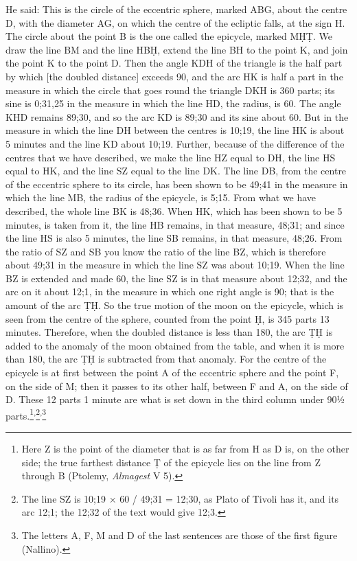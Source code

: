 \documentclass[11pt]{article}
\newcommand{\ArPage}[1]{\marginpar{\footnotesize\color{gray}Ar.\,p.\,#1}}
\begin{document}
\par \ArPage{82}He said: This is the circle of the eccentric sphere, marked ABG, about the centre D, with the diameter AG, on which the centre of the ecliptic falls, at the sign H. The circle about the point B is the one called the epicycle, marked MḤṬ. We draw the line BM and the line HBḤ, extend the line BH to the point K, and join the point K to the point D. Then the angle KDH of the triangle is the half part by which [the doubled distance] exceeds 90, and the arc HK is half a part in the measure in which the circle that goes round the triangle DKH is 360 parts; its sine is 0;31,25 in the measure in which the line HD, the radius, is 60. The angle KHD remains 89;30, and so the arc KD is 89;30 and its sine about 60. But in the measure in which the line DH between the centres is 10;19, the line HK is about 5 minutes and the line KD about 10;19. Further, because of the difference of the centres that we have described, we make the line HZ equal to DH, the line HS equal to HK, and the line SZ equal to the line DK. The line DB, from the centre of the eccentric sphere to its circle, has been shown to be 49;41 in the measure in which the line MB, the radius of the epicycle, is 5;15. From what we have described, the whole line BK is 48;36. When HK, which has been shown to be 5 minutes, is taken from it, the line HB remains, in that measure, 48;31; and since the line HS is also 5 minutes, the line SB remains, in that measure, 48;26. From the ratio of SZ and SB you know the ratio of the line BZ, which is therefore about 49;31 in the measure in which the line SZ was about 10;19. When the line BZ is extended and made 60, the line SZ is in that measure about 12;32, and the arc on it about 12;1, in the measure in which one right angle is 90; that is the amount of the arc ṬḤ. So the true motion of the moon on the epicycle, which is seen from the centre of the sphere, counted from the point Ḥ, is 345 parts 13 minutes. Therefore, when the doubled distance is less than 180, the arc ṬḤ is added to the anomaly of the moon obtained from the table, and when it is more than 180, the arc ṬḤ is subtracted from that anomaly. For the centre of the epicycle is at first between the point A of the eccentric sphere and the point F, on the side of M; then it passes to its other half, between F and A, on the side of D. These 12 parts 1 minute are what is set down in the third column under 90½ parts.\footnote{Here Z is the point of the diameter that is as far from H as D is, on the other side; the true farthest distance Ṭ of the epicycle lies on the line from Z through B (Ptolemy, \emph{Almagest} V 5).}\textsuperscript{,}\footnote{The line SZ is 10;19 × 60 / 49;31 = 12;30, as Plato of Tivoli has it, and its arc 12;1; the 12;32 of the text would give 12;3.}\textsuperscript{,}\footnote{The letters A, F, M and D of the last sentences are those of the first figure (Nallino).}\par
\end{document}
